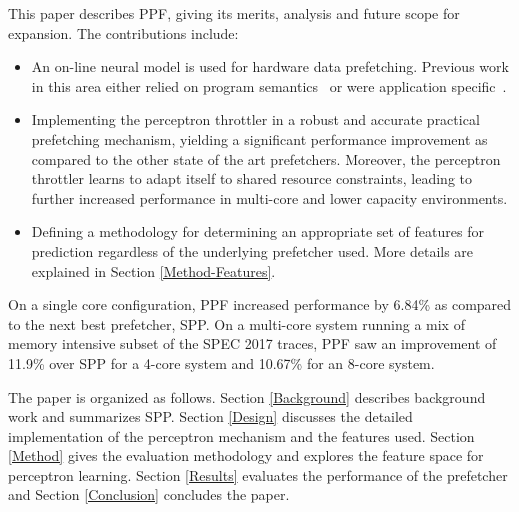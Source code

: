 \vspace{1ex}This paper describes PPF, giving its merits, analysis and
future scope for expansion.  The contributions include:

\begin{itemize}

\item An on-line neural model is used for hardware data
  prefetching.  Previous work in this area either relied on program
  semantics~\cite{Semantics} or were application specific~\cite{Datacenter}.

\item Implementing the perceptron throttler in a robust and accurate
  practical prefetching mechanism, yielding a significant performance
  improvement as compared to the other state of the art prefetchers.
  Moreover, the perceptron throttler learns to adapt itself to shared resource
  constraints, leading to further increased performance in multi-core and
  lower capacity environments.

\item Defining a methodology for determining an appropriate set of 
  features for prediction regardless of the underlying prefetcher used.
  More details are explained in Section \ref{Method-Features}.

\end{itemize}

On a single core configuration, PPF increased performance by 6.84\% as
compared to the next best prefetcher, SPP.  On a multi-core system running a
mix of memory intensive subset of the SPEC 2017 traces, PPF saw an improvement
of 11.9\% over SPP for a 4-core system and 10.67\% for an 8-core system.

The paper is organized as follows. Section \ref{Background} describes
background work and summarizes SPP.  Section \ref{Design} discusses the
detailed implementation of the perceptron mechanism and the features used.
Section \ref{Method} gives the evaluation methodology and explores the feature
space for perceptron learning.  Section \ref{Results} evaluates the
performance of the prefetcher and Section \ref{Conclusion} concludes the
paper.
